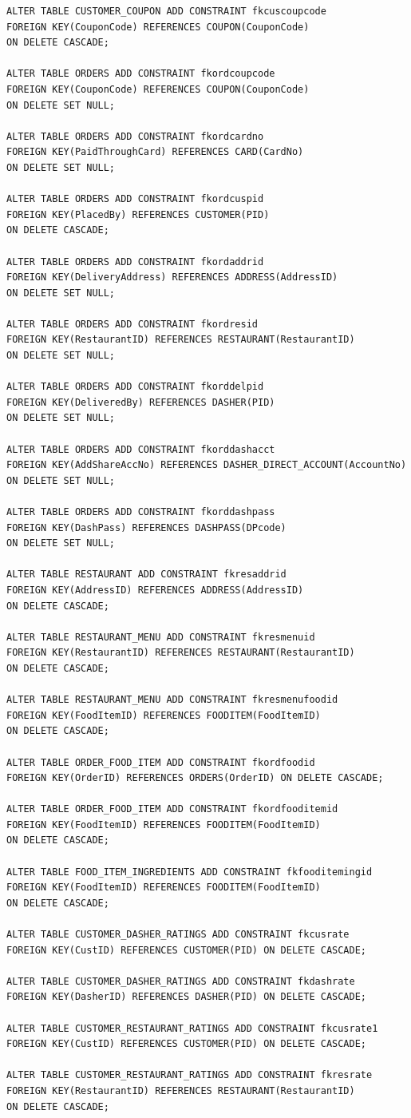 \documentclass[12pt,letterpaper]{article}
\begin{document}
\begin{lstlisting}
ALTER TABLE CUSTOMER_COUPON ADD CONSTRAINT fkcuscoupcode 
FOREIGN KEY(CouponCode) REFERENCES COUPON(CouponCode) 
ON DELETE CASCADE;

ALTER TABLE ORDERS ADD CONSTRAINT fkordcoupcode 
FOREIGN KEY(CouponCode) REFERENCES COUPON(CouponCode) 
ON DELETE SET NULL;

ALTER TABLE ORDERS ADD CONSTRAINT fkordcardno 
FOREIGN KEY(PaidThroughCard) REFERENCES CARD(CardNo) 
ON DELETE SET NULL;

ALTER TABLE ORDERS ADD CONSTRAINT fkordcuspid 
FOREIGN KEY(PlacedBy) REFERENCES CUSTOMER(PID) 
ON DELETE CASCADE;

ALTER TABLE ORDERS ADD CONSTRAINT fkordaddrid 
FOREIGN KEY(DeliveryAddress) REFERENCES ADDRESS(AddressID) 
ON DELETE SET NULL;

ALTER TABLE ORDERS ADD CONSTRAINT fkordresid 
FOREIGN KEY(RestaurantID) REFERENCES RESTAURANT(RestaurantID) 
ON DELETE SET NULL;

ALTER TABLE ORDERS ADD CONSTRAINT fkorddelpid 
FOREIGN KEY(DeliveredBy) REFERENCES DASHER(PID) 
ON DELETE SET NULL;

ALTER TABLE ORDERS ADD CONSTRAINT fkorddashacct 
FOREIGN KEY(AddShareAccNo) REFERENCES DASHER_DIRECT_ACCOUNT(AccountNo) 
ON DELETE SET NULL;

ALTER TABLE ORDERS ADD CONSTRAINT fkorddashpass 
FOREIGN KEY(DashPass) REFERENCES DASHPASS(DPcode) 
ON DELETE SET NULL;

ALTER TABLE RESTAURANT ADD CONSTRAINT fkresaddrid 
FOREIGN KEY(AddressID) REFERENCES ADDRESS(AddressID) 
ON DELETE CASCADE;

ALTER TABLE RESTAURANT_MENU ADD CONSTRAINT fkresmenuid 
FOREIGN KEY(RestaurantID) REFERENCES RESTAURANT(RestaurantID) 
ON DELETE CASCADE;

ALTER TABLE RESTAURANT_MENU ADD CONSTRAINT fkresmenufoodid 
FOREIGN KEY(FoodItemID) REFERENCES FOODITEM(FoodItemID) 
ON DELETE CASCADE;

ALTER TABLE ORDER_FOOD_ITEM ADD CONSTRAINT fkordfoodid 
FOREIGN KEY(OrderID) REFERENCES ORDERS(OrderID) ON DELETE CASCADE;

ALTER TABLE ORDER_FOOD_ITEM ADD CONSTRAINT fkordfooditemid 
FOREIGN KEY(FoodItemID) REFERENCES FOODITEM(FoodItemID) 
ON DELETE CASCADE;

ALTER TABLE FOOD_ITEM_INGREDIENTS ADD CONSTRAINT fkfooditemingid 
FOREIGN KEY(FoodItemID) REFERENCES FOODITEM(FoodItemID) 
ON DELETE CASCADE;

ALTER TABLE CUSTOMER_DASHER_RATINGS ADD CONSTRAINT fkcusrate 
FOREIGN KEY(CustID) REFERENCES CUSTOMER(PID) ON DELETE CASCADE;

ALTER TABLE CUSTOMER_DASHER_RATINGS ADD CONSTRAINT fkdashrate 
FOREIGN KEY(DasherID) REFERENCES DASHER(PID) ON DELETE CASCADE;

ALTER TABLE CUSTOMER_RESTAURANT_RATINGS ADD CONSTRAINT fkcusrate1 
FOREIGN KEY(CustID) REFERENCES CUSTOMER(PID) ON DELETE CASCADE;

ALTER TABLE CUSTOMER_RESTAURANT_RATINGS ADD CONSTRAINT fkresrate 
FOREIGN KEY(RestaurantID) REFERENCES RESTAURANT(RestaurantID) 
ON DELETE CASCADE;

\end{lstlisting}
\end{document}
